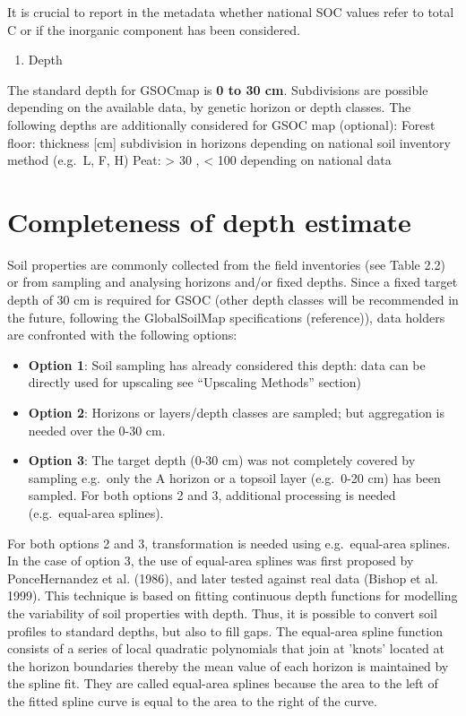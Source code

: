 \documentclass[]{book}
\providecommand{\tightlist}{%
  \setlength{\itemsep}{0pt}\setlength{\parskip}{0pt}}
\theoremstyle{definition}
\theoremstyle{definition}
\theoremstyle{definition}
\theoremstyle{remark}
\begin{document}
It is crucial to report in the metadata whether national SOC values
refer to total C or if the inorganic component has been considered.

\begin{enumerate}
\def\labelenumi{\alph{enumi})}
\setcounter{enumi}{4}
\tightlist
\item
  Depth
\end{enumerate}

The standard depth for GSOCmap is \textbf{0 to 30 cm}. Subdivisions are
possible depending on the available data, by genetic horizon or depth
classes. The following depths are additionally considered for GSOC map
(optional): Forest floor: thickness {[}cm{]} subdivision in horizons
depending on national soil inventory method (e.g.~L, F, H) Peat:
\textgreater{} 30 , \textless{} 100 depending on national data

\section{Completeness of depth
estimate}\label{completeness-of-depth-estimate}

Soil properties are commonly collected from the field inventories (see
Table 2.2) or from sampling and analysing horizons and/or fixed depths.
Since a fixed target depth of 30 cm is required for GSOC (other depth
classes will be recommended in the future, following the GlobalSoilMap
specifications (reference)), data holders are confronted with the
following options:

\begin{itemize}
\tightlist
\item
  \textbf{Option 1}: Soil sampling has already considered this depth:
  data can be directly used for upscaling see ``Upscaling Methods''
  section)
\item
  \textbf{Option 2}: Horizons or layers/depth classes are sampled; but
  aggregation is needed over the 0-30 cm.
\item
  \textbf{Option 3}: The target depth (0-30 cm) was not completely
  covered by sampling e.g.~only the A horizon or a topsoil layer
  (e.g.~0-20 cm) has been sampled. For both options 2 and 3, additional
  processing is needed (e.g.~equal-area splines).
\end{itemize}

For both options 2 and 3, transformation is needed using e.g.~equal-area
splines. In the case of option 3, the use of equal-area splines was
first proposed by PonceHernandez et al. (1986), and later tested against
real data (Bishop et al. 1999). This technique is based on fitting
continuous depth functions for modelling the variability of soil
properties with depth. Thus, it is possible to convert soil profiles to
standard depths, but also to fill gaps. The equal-area spline function
consists of a series of local quadratic polynomials that join at 'knots'
located at the horizon boundaries thereby the mean value of each horizon
is maintained by the spline fit. They are called equal-area splines
because the area to the left of the fitted spline curve is equal to the
area to the right of the curve.
\end{document}
